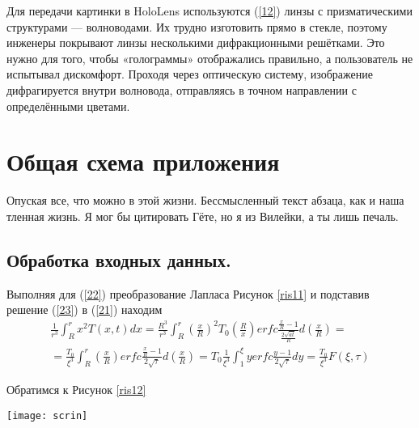 \documentclass[a4paper, 14pt]{extreport} %
\begin{document}
Для передачи картинки в HoloLens используются (\ref{12}) линзы с призматическими структурами — волноводами. Их трудно изготовить прямо в стекле, поэтому инженеры \cite{b8} покрывают линзы несколькими дифракционными решётками. Это нужно для того, чтобы «голограммы» отображались правильно, а пользователь не испытывал дискомфорт. Проходя через оптическую систему, изображение дифрагируется внутри волновода, отправляясь в точном направлении с определёнными цветами.

\section{Общая схема приложения}
Опуская все, что можно в этой жизни. Бессмысленный текст абзаца, как и наша тленная жизнь. Я мог бы цитировать Гёте, но я из Вилейки, а ты лишь печаль.
\vspace{0.6cm}

\subsection{Обработка входных данных.} 
Выполняя для (\ref{22}) преобразование Лапласа Рисунок \ref{ris11} и подставив решение (\ref{23}) в (\ref{21}) находим
\vspace{0.4cm}
\begin{equation}\begin{split}
\label{13}
\frac{1}{r^{3}}\int_{R}^{r}{x^{2}T(x,t)dx}=\frac{R^{3}}{r^{3}}\int_{R}^{r}{\left(\frac{x}{R}\right)^{2}T_{0}\left(\frac{R}{x}\right)erfc\frac{\frac{x}{R}-1}{\frac{2\sqrt{at}}{R}}d\left(\frac{x}{R}\right)}=\\
=\frac{T_0}{\xi^3}\int_{R}^{r}{\left(\frac{x}{R}\right)erfc\frac{\frac{x}{R}-1}{2\sqrt{\tau}}d\left(\frac{x}{R}\right)}=T_{0}\frac{1}{\xi^3}\int_{1}^{\xi}{yerfc\frac{y-1}{2\sqrt{\tau}}dy}=\frac{T_0}{\xi^3}F(\xi,\tau)
\end{split}\end{equation}
\vspace{0.4cm}

Обратимся к Рисунок \ref{ris12}

\begin{center}
	\begin{minipage}{0.7\linewidth}
		\texttt{[image: scrin]}
		\label{ris11}
	\end{minipage}
\end{center}

\vspace{0.8cm}
\end{document}
